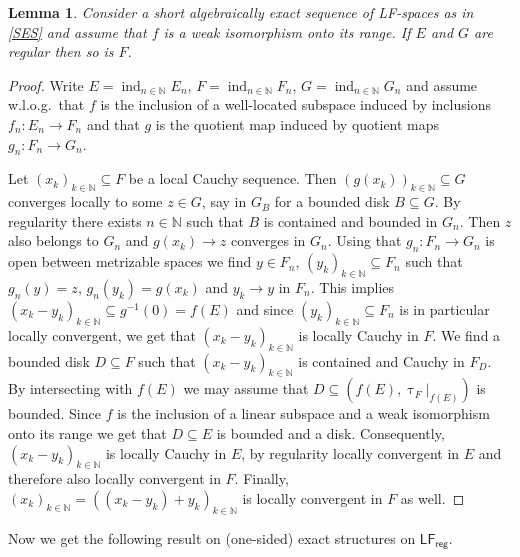 \documentclass[11pt, a4paper, reqno]{amsart}
\newtheorem{lem}[thm]{Lemma}
\theoremstyle{definition}
\newcommand{\ind}{\operatorname{ind}\nolimits}
\newcommand{\NN}{\mathbb{N}}
\newcommand{\LFr}{\mathsf{LF}_{\mathsf{reg}}}
\begin{document}
\begin{lem}\label{LEM} Consider a short algebraically exact sequence of LF-spaces as in \eqref{SES} and assume that $f$ is a weak isomorphism onto its range. If $E$ and $G$ are regular then so is $F$.
\end{lem}
\begin{proof}Write $E=\ind_{n\in\NN}E_n$, $F=\ind_{n\in\NN}F_n$, $G=\ind_{n\in\NN}G_n$ and assume w.l.o.g.\ that $f$ is the inclusion of a well-located subspace induced by inclusions $f_n\colon E_n\rightarrow F_n$ and that $g$ is the quotient map induced by quotient maps $g_n\colon F_n\rightarrow G_n$.

\smallskip

Let $(x_k)_{k\in\NN}\subseteq F$ be a local Cauchy sequence. Then $(g(x_k))_{k\in\NN}\subseteq G$ converges locally to some $z\in G$, say in $G_B$ for a bounded disk $B\subseteq G$. By regularity there exists $n\in\NN$ such that $B$ is contained and bounded in $G_n$. Then $z$ also belongs to $G_n$ and $g(x_k)\rightarrow z$ converges in $G_n$. Using that $g_n\colon F_n\rightarrow G_n$ is open between metrizable spaces we find $y\in F_n$, $(y_k)_{k\in\NN}\subseteq F_n$ such that $g_n(y)=z$, $g_n(y_k)=g(x_k)$ and $y_k\rightarrow y$ in $F_n$. This implies $(x_k-y_k)_{k\in\NN}\subseteq g^{-1}(0)=f(E)$ and since $(y_k)_{k\in\NN}\subseteq F_n$ is in particular locally convergent, we get that $(x_k-y_k)_{k\in\NN}$ is locally Cauchy in $F$. We find a bounded disk $D\subseteq F$ such that $(x_k-y_k)_{k\in\NN}$ is contained and Cauchy in $F_D$. By intersecting with $f(E)$ we may assume that $D\subseteq (f(E),\uptau_F|_{f(E)})$ is bounded. Since $f$ is the inclusion of a linear subspace and a weak isomorphism onto its range we get that $D\subseteq E$ is bounded and a disk. Consequently, $(x_k-y_k)_{k\in\NN}$ is locally Cauchy in $E$, by regularity locally convergent in $E$ and therefore also locally convergent in $F$. Finally, $(x_k)_{k\in\NN}=((x_k-y_k)+y_k)_{k\in\NN}$ is locally convergent in $F$ as well. 
\end{proof}



Now we get the following result on (one-sided) exact structures on $\LFr$.
\end{document}

